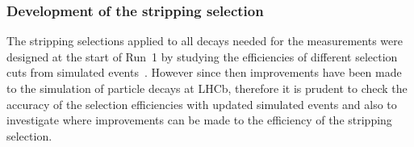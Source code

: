 \subsubsection{Development of the stripping selection}
\label{strippingold}

The stripping selections applied to all decays needed for the \BF measurements were designed at the start of Run~1 by studying the efficiencies of different selection cuts from simulated events~\cite{Diego}. However since then improvements have been made to the simulation of particle decays at LHCb, therefore it is prudent to check the accuracy of the selection efficiencies with updated simulated events and also to investigate where improvements can be made to the efficiency of the \bmumu stripping selection.%



